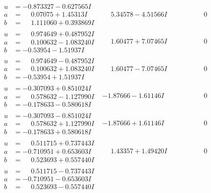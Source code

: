 \documentclass[1p]{elsarticle_modified}
\theoremstyle{definition}
\begin{document}
$$\begin{array}{c|c|c}
\begin{aligned}
u &= -0.873327 - 0.627565 I \\
a &= \phantom{-}0.07075 + 1.45313 I \\
b &= \phantom{-}1.111060 + 0.393869 I\end{aligned}
 & \phantom{-}5.34578 - 4.51566 I & \phantom{-0.000000 } 0 \\ \hline\begin{aligned}
u &= \phantom{-}0.974649 + 0.487952 I \\
a &= \phantom{-}0.100632 - 1.083240 I \\
b &= -0.53954 - 1.51937 I\end{aligned}
 & \phantom{-}1.60477 + 7.07465 I & \phantom{-0.000000 } 0 \\ \hline\begin{aligned}
u &= \phantom{-}0.974649 - 0.487952 I \\
a &= \phantom{-}0.100632 + 1.083240 I \\
b &= -0.53954 + 1.51937 I\end{aligned}
 & \phantom{-}1.60477 - 7.07465 I & \phantom{-0.000000 } 0 \\ \hline\begin{aligned}
u &= -0.307093 + 0.851024 I \\
a &= \phantom{-}0.578632 - 1.127990 I \\
b &= -0.178633 - 0.580618 I\end{aligned}
 & -1.87666 - 1.61146 I & \phantom{-0.000000 } 0 \\ \hline\begin{aligned}
u &= -0.307093 - 0.851024 I \\
a &= \phantom{-}0.578632 + 1.127990 I \\
b &= -0.178633 + 0.580618 I\end{aligned}
 & -1.87666 + 1.61146 I & \phantom{-0.000000 } 0 \\ \hline\begin{aligned}
u &= \phantom{-}0.511715 + 0.737443 I \\
a &= -0.710951 + 0.653603 I \\
b &= \phantom{-}0.523693 + 0.557440 I\end{aligned}
 & \phantom{-}1.43357 + 1.49420 I & \phantom{-0.000000 } 0 \\ \hline\begin{aligned}
u &= \phantom{-}0.511715 - 0.737443 I \\
a &= -0.710951 - 0.653603 I \\
b &= \phantom{-}0.523693 - 0.557440 I\end{aligned}

\end{array}$$
\end{document}

